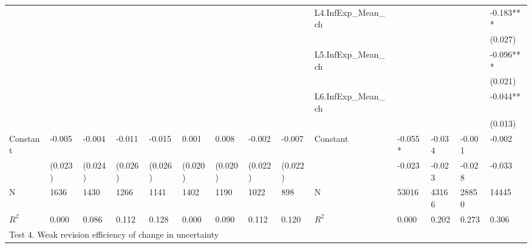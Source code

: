 \documentclass[12pt]{article}
\begin{document}
\begin{table}
\begin{adjustbox}{width={24cm},totalheight={14cm}}
\begin{threeparttable}
\begin{tabular}{llllllllllllll}
					&             &           &           &           &               &           &           &           & L4.InfExp\_Mean\_ch &         &           &           & -0.183*** \\
					
					&             &           &           &           &               &           &           &           &                                 &         &           &           & (0.027)    \\
					&             &           &           &           &               &           &           &           & L5.InfExp\_Mean\_ch &         &           &           & -0.096*** \\
					&             &           &           &           &               &           &           &           &                      &         &           &           & (0.021)    \\
					&             &           &           &           &               &           &           &           & L6.InfExp\_Mean\_ch &         &           &           & -0.044**  \\
					&             &           &           &           &               &           &           &           &                                     &         &           &           & (0.013)    \\
					Constant               & -0.005      & -0.004    & -0.011    & -0.015    & 0.001         & 0.008     & -0.002    & -0.007    & Constant              & -0.055* & -0.034    & -0.001    & -0.002    \\
					& (0.023)     & (0.024)   & (0.026)   & (0.026)   & (0.020)       & (0.020)   & (0.022)   & (0.022)   &                                 & -0.023  & -0.023    & -0.028    & -0.033    \\
					\hline 
					N                    & 1636        & 1430      & 1266      & 1141      & 1402          & 1190      & 1022      & 898       & N                   & 53016   & 43166     & 28850     & 14445     \\
					$R^2$                  & 0.000       & 0.086     & 0.112     & 0.128     & 0.000         & 0.090     & 0.112     & 0.120     & $R^2$ &  0.000       & 0.202     & 0.273     & 0.306   \\
					\hline 
					\multicolumn{14}{l}{Test 4. Weak revision efficiency of change in uncertainty}                \\
					\hline                                                                                                                 

\end{tabular}
\end{threeparttable}
\end{adjustbox}
\end{table}
\end{document}
